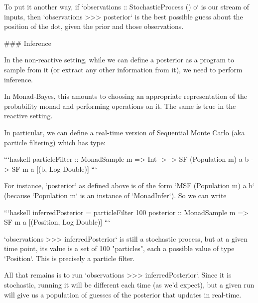 To put it another way, if `observations :: StochasticProcess () o` is our stream of inputs, then `observations >>> posterior` is the best possible guess about the position of the dot, given the prior and those observations.

### Inference

In the non-reactive setting, while we can define a posterior as a program
    to sample from it (or extract any other information from it), we need to perform inference. 

In Monad-Bayes, this amounts to choosing an appropriate representation of the probability monad and performing operations on it. The same is true in the reactive setting.

In particular, we can define a real-time version of Sequential Monte Carlo (aka particle filtering) which has type:

```haskell
particleFilter :: MonadSample m => Int ->
  -> SF (Population m) a b
  -> SF m a [(b, Log Double)]
```

For instance, `posterior` as defined above is of the form `MSF (Population m) a b` (because `Population m` is an instance of `MonadInfer`). So we can write

```haskell
inferredPosterior = particleFilter 100 posterior :: MonadSample m => SF m a [(Position, Log Double)] 
```

`observations >>> inferredPosterior` is still a stochastic process, but at a given time point, its value is a set of 100 "particles", each a possible value of type `Position`. This is precisely a particle filter.

All that remains is to run `observations >>> inferredPosterior`. Since it is stochastic, running it will be different each time (as we'd expect), but a given run will give us a population of guesses of the posterior that updates in real-time.